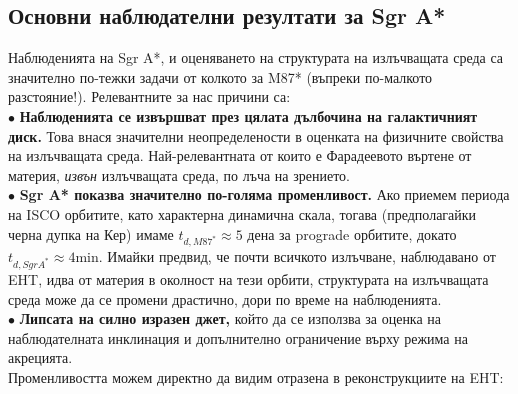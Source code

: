 \subsection{Основни наблюдателни резултати за Sgr A*}

Наблюденията на Sgr A*, и оценяването на структурата на излъчващата среда са значително по-тежки задачи от колкото за M87* (въпреки по-малкото разстояние!). Релевантните за нас причини са:\\\newline
$\bullet$ \textbf{Наблюденията се извършват през цялата дълбочина на галактичният диск.} Това внася значителни неопределености в оценката на физичните свойства на излъчващата среда. Най-релевантната от които е Фарадеевото въртене от материя, \emph{извън} излъчващата среда, по лъча на зрението.\\\newline
$\bullet$ \textbf{Sgr A* показва значително по-голяма променливост.} Ако приемем периода на ISCO орбитите, като характерна динамична скала, тогава (предполагайки черна дупка на Кер) имаме $t_{d,M87^*} \approx 5 $ дена за prograde орбитите, докато $t_{d,Sgr A^*}\approx 4 \text{min}$. Имайки предвид, че почти всичкото излъчване, наблюдавано от EHT, идва от материя в околност на тези орбити, структурата на излъчващата среда може да се промени драстично, дори по време на наблюденията. \\\newline
$\bullet$ \textbf{Липсата на силно изразен джет,} който да се използва за оценка на наблюдателната инклинация и допълнително ограничение върху режима на акрецията.\\\newline
Променливостта можем директно да видим отразена в реконструкциите на EHT:\\

